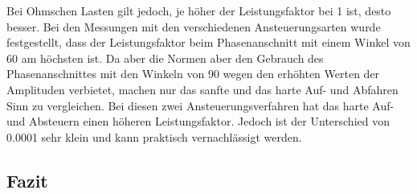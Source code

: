 Bei Ohmschen Lasten gilt jedoch, je höher der Leistungsfaktor bei 1 ist, desto besser. Bei den Messungen mit den verschiedenen Ansteuerungsarten wurde festgestellt, dass der Leistungsfaktor beim Phasenanschnitt mit einem Winkel von 60\textdegree \hspace{0.02cm} am höchsten ist. Da aber die Normen aber den Gebrauch des Phasenanschnittes mit den Winkeln von 90\textdegree \hspace{0.02cm} wegen den erhöhten Werten der Amplituden verbietet, machen nur das sanfte und das harte Auf- und Abfahren Sinn zu vergleichen. Bei diesen zwei Ansteuerungsverfahren hat das harte Auf- und Absteuern einen höheren Leistungsfaktor. Jedoch ist der Unterschied von 0.0001 sehr klein und kann praktisch vernachlässigt werden.
 



\newpage
\subsection{Fazit}

